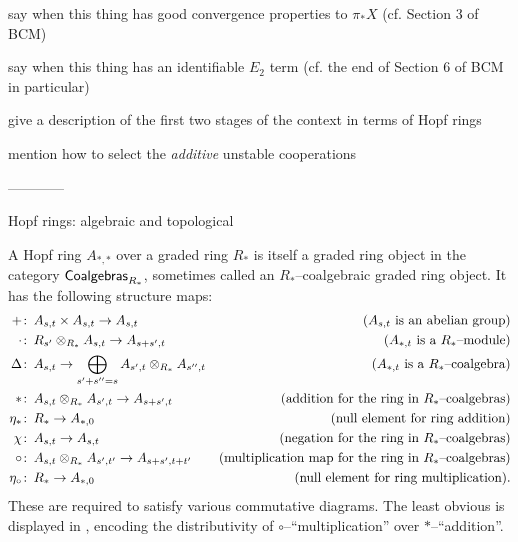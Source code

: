 say when this thing has good convergence properties to $\pi_* X$ (cf. Section 3 of BCM)

say when this thing has an identifiable $E_2$ term (cf. the end of Section 6 of BCM in particular)

give a description of the first two stages of the context in terms of Hopf rings

mention how to select the \emph{additive} unstable cooperations

------------




Hopf rings: algebraic and topological

\begin{definition}
A Hopf ring $A_{*, *}$ over a graded ring $R_*$ is itself a graded ring object in the category $\mathsf{Coalgebras}_{R_*}$, sometimes called an $R_*$--coalgebraic graded ring object.  It has the following structure maps:
\begin{align*}
+ & \colon\thinspace A_{s, t} \times A_{s, t} \to A_{s, t} & \text{($A_{s, t}$ is an abelian group)} \\
\cdot & \colon\thinspace R_{s'} \otimes_{R_*} A_{s, t} \to A_{s+s', t} & \text{($A_{*, t}$ is a $R_*$--module)} \\
\Delta & \colon\thinspace A_{s, t} \to \bigoplus_{s' + s'' = s} A_{s', t} \otimes_{R_*} A_{s'', t} & \text{($A_{*, t}$ is a $R_*$--coalgebra)} \\
\ast & \colon\thinspace A_{s, t} \otimes_{R_*} A_{s', t} \to A_{s + s', t} & \text{(addition for the ring in $R_*$--coalgebras)} \\
\eta_\ast & \colon\thinspace R_* \to A_{*, 0} & \text{(null element for ring addition)} \\
\chi & \colon\thinspace A_{s, t} \to A_{s, t} & \text{(negation for the ring in $R_*$--coalgebras)} \\
\circ & \colon\thinspace A_{s, t} \otimes_{R_*} A_{s', t'} \to A_{s + s', t + t'} & \text{(multiplication map for the ring in $R_*$--coalgebras)} \\
\eta_\circ & \colon\thinspace R_* \to A_{*, 0} & \text{(null element for ring multiplication)}.
\end{align*}
These are required to satisfy various commutative diagrams. The least obvious is displayed in , encoding the distributivity of $\circ$--``multiplication'' over $\ast$--``addition''.
\end{definition}

